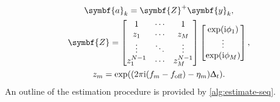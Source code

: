 \begin{subequations}
    \begin{gather}
        \symbf{a}_k = \symbf{Z}^+ \symbf{y}_k, \\
        \symbf{Z} =
        \begin{bmatrix}
            1 & \cdots & 1 \\
            z_1 & \cdots & z_M\\
            \vdots & \ddots & \vdots \\
            z_1^{N-1} & \cdots & z_M^{N-1}
        \end{bmatrix}
        \begin{bmatrix}
            \exp(\iu \phi_1) \\ \vdots \\ \exp(\iu \phi_M)
        \end{bmatrix},\\
        z_m = \exp((2\pi \iu (f_m - \foff) - \eta_m)\Dt).
    \end{gather}
\end{subequations}
An outline of the estimation procedure is provided by \cref{alg:estimate-seq}.

